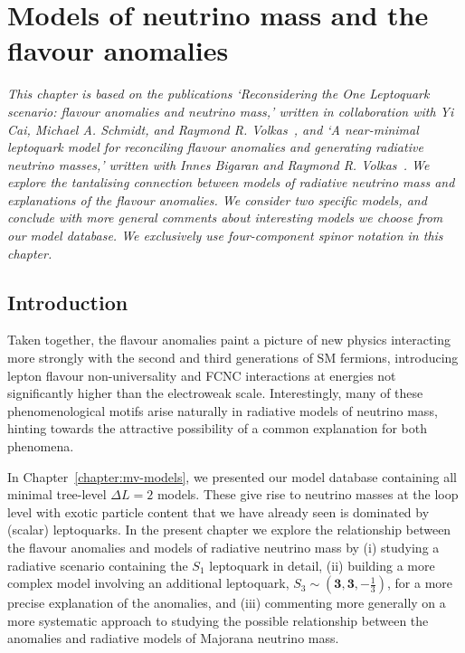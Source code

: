\graphicspath{{img/chapter_4/}}

\chapter{Models of neutrino mass and the flavour anomalies}
\label{chapter:neutrino-mass-and-flavour-anomalies}

\begin{flushleft}
  \textit{This chapter is based on the publications `Reconsidering the One
    Leptoquark scenario: flavour anomalies and neutrino mass,' written in
    collaboration with Yi Cai, Michael A. Schmidt, and Raymond R.
    Volkas~\cite{Cai:2017wry}, and `A near-minimal leptoquark model for
    reconciling flavour anomalies and generating radiative neutrino masses,'
    written with Innes Bigaran and Raymond R. Volkas~\cite{Bigaran:2019bqv}. We
    explore the tantalising connection between models of radiative neutrino mass
    and explanations of the flavour anomalies. We consider two specific models,
    and conclude with more general comments about interesting models we choose
    from our model database. We exclusively use four-component spinor notation
    in this chapter.}
\end{flushleft}

\section{Introduction}

Taken together, the flavour anomalies paint a picture of new physics interacting
more strongly with the second and third generations of SM fermions, introducing
lepton flavour non-universality and FCNC interactions at energies not
significantly higher than the electroweak scale. Interestingly, many of these
phenomenological motifs arise naturally in radiative models of neutrino mass,
hinting towards the attractive possibility of a common explanation for both
phenomena.

In Chapter~\ref{chapter:mv-models}, we presented our model database containing
all minimal tree-level $\Delta L = 2$ models. These give rise to neutrino masses
at the loop level with exotic particle content that we have already seen is
dominated by (scalar) leptoquarks. In the present chapter we explore the
relationship between the flavour anomalies and models of radiative neutrino mass
by (i) studying a radiative scenario containing the $S_{1}$ leptoquark in
detail, (ii) building a more complex model involving an additional leptoquark,
$S_{3} \sim (\mathbf{3}, \mathbf{3}, -\tfrac{1}{3})$, for a more precise
explanation of the anomalies, and (iii) commenting more generally on a more
systematic approach to studying the possible relationship between the anomalies
and radiative models of Majorana neutrino mass.


